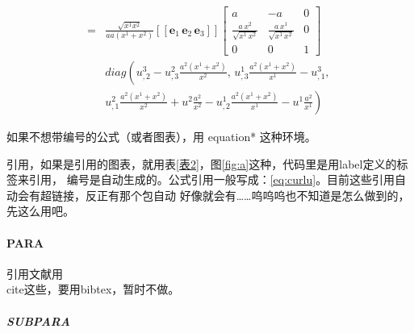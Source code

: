\documentclass[UTF8,zihao=5]{ctexart} %
\begin{document}
\begin{equation}
\begin{aligned}
        = & \frac{\sqrt{x^1x^2}}{aa(x^1+x^2)}
        [[\bm{e}_1\,\bm{e}_2\,\bm{e}_3]]
        \left[\begin{array}{ccc} a & -a & 0\\ \frac{a\,x^{2}}{\sqrt{x^{1}\,x^{2}}} & \frac{a\,x^{1}}{\sqrt{x^{1}\,x^{2}}} & 0\\ 0 & 0 & 1 \end{array}\right]              \\
          & diag\left(
        u^3_{,2}-u^2_{,3}\frac{a^2(x^1+x^2)}{x^2},\,
        u^1_{,3}\frac{a^2(x^1+x^2)}{x^1}-u^3_{,1},\, \right. \\
          & \left.
        u^2_{,1}\frac{a^2(x^1+x^2)}{x^2}+u^2\frac{a^2}{x^2}
        -
        u^1_{,2}\frac{a^2(x^1+x^2)}{x^1}-u^1\frac{a^2}{x^1}
        \right)
    \end{aligned}
    \label{eq:curlu}
\end{equation}

如果不想带编号的公式（或者图表），用 equation* 这种环境。

引用，如果是引用的图表，就用表\ref{表2}，图\ref{fig:a}这种，代码里是用label定义的标签来引用，
编号是自动生成的。公式引用一般写成：\eqref{eq:curlu}。目前这些引用自动会有超链接，反正有那个包自动
好像就会有……呜呜呜也不知道是怎么做到的，先这么用吧。

\paragraph{PARA}

引用文献用\\cite这些，要用bibtex，暂时不做。

\subparagraph{SUBPARA}
\end{document}
